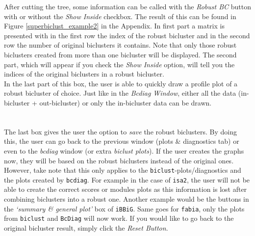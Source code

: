 \documentclass[a4paper]{article}\usepackage[]{graphicx}\usepackage[]{color}
\begin{document}
After cutting the tree, some information can be called with the {\it Robust BC} 
button with or without the {\it Show Inside} checkbox. The result of this can be
found in Figure \ref{superbiclust_example2} in the Appendix. In first part a
matrix is presented with in the first row the index of the robust bicluster and
in the second row the number of original biclusters it contains. Note that only
those robust biclusters created from more than one bicluster will be displayed.
The second part, which will appear if you check the {\it Show Inside} option,
will tell you the indices of the original biclusters in a robust bicluster.\\
In the last part of this box, the user is able to quickly draw a profile plot of
a robust bicluster of choice. Just like in the {\it Bcdiag Window}, either all
the data (in-bicluster + out-bicluster) or only the in-bicluster data can be
drawn. 
\\ \\
\\
The last box gives the user the option to {\it save} the robust biclusters. By
doing this, the user can go back to the previous window (plots \& diagnostics
tab) or even to the {\it bcdiag} window (or extra {\it biclust plots}). If the user creates the graphs now,
they will be based on the robust biclusters instead of the original ones.
However, take note that this only applies to the
\verb|biclust|-plots/diagnostics and the plots created by \verb|bcdiag|. 
For example in the case of \verb|isa2|, the user will not be able to create the
correct scores or modules plots as this information is lost after combining
biclusters into a robust one. Another example would be the buttons in the {\it
`summary \& general plot'} box of \verb|iBBiG|. Same goes for \verb|fabia|,
only the plots from \verb|biclust| and \verb|BcDiag| will now work. If you would
like to go back to the original bicluster result, simply click the {\it Reset Button}.


\newpage
\end{document}
